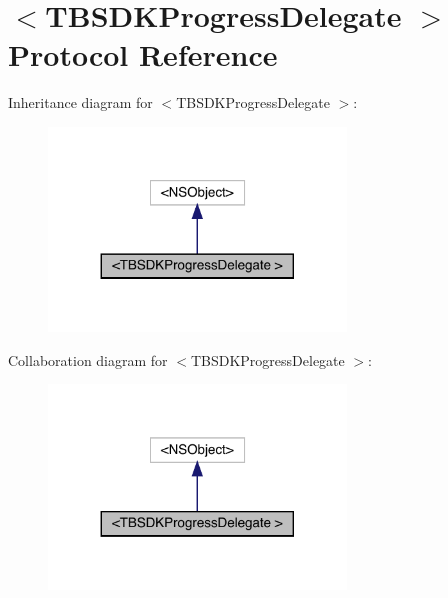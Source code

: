 \hypertarget{protocol_t_b_s_d_k_progress_delegate_01-p}{}\section{$<$T\+B\+S\+D\+K\+Progress\+Delegate $>$ Protocol Reference}
\label{protocol_t_b_s_d_k_progress_delegate_01-p}


Inheritance diagram for $<$T\+B\+S\+D\+K\+Progress\+Delegate $>$\+:\nopagebreak
\begin{figure}[H]
\begin{center}
\leavevmode
\includegraphics[width=224pt]{protocol_t_b_s_d_k_progress_delegate_01-p__inherit__graph}
\end{center}
\end{figure}


Collaboration diagram for $<$T\+B\+S\+D\+K\+Progress\+Delegate $>$\+:\nopagebreak
\begin{figure}[H]
\begin{center}
\leavevmode
\includegraphics[width=224pt]{protocol_t_b_s_d_k_progress_delegate_01-p__coll__graph}
\end{center}
\end{figure}
